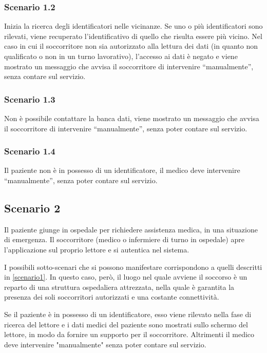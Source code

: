 \documentclass[a4paper,12pt]{report}
\begin{document}
\subsubsection*{Scenario 1.2}
Inizia la ricerca degli identificatori nelle vicinanze. Se uno o più identificatori sono rilevati, viene recuperato l'identificativo di quello che risulta essere più vicino. Nel caso in cui il soccorritore non sia autorizzato alla lettura dei dati (in quanto non qualificato o non in un turno lavorativo), l'accesso ai dati è negato e viene mostrato un messaggio che avvisa il soccorritore di intervenire ``manualmente'', senza contare sul servizio.
\subsubsection*{Scenario 1.3} 
Non è possibile contattare la banca dati, viene mostrato un messaggio che avvisa il soccorritore di intervenire ``manualmente'', senza poter contare sul servizio.
\subsubsection*{Scenario 1.4}
Il paziente non è in possesso di un identificatore, il medico deve intervenire  ``manualmente'', senza poter contare sul servizio.

\subsection{Scenario 2}
Il paziente giunge in ospedale per richiedere assistenza medica, in una situazione di emergenza. Il soccorritore (medico o infermiere di turno in ospedale) apre l'applicazione sul proprio lettore e si autentica nel sistema. 

I possibili sotto-scenari che si possono manifestare corrispondono a quelli descritti in \autoref{scenario1}. In questo caso, però, il luogo nel quale avviene il soccorso è un reparto di una struttura ospedaliera attrezzata, nella quale è garantita la presenza dei soli soccorritori autorizzati e una costante connettività. 

Se il paziente è in possesso di un identificatore, esso viene rilevato nella fase di ricerca del lettore e i dati medici del paziente sono mostrati sullo schermo del lettore, in modo da fornire un supporto per il soccorritore. Altrimenti il medico deve intervenire "manualmente" senza poter contare sul servizio.
\end{document}
